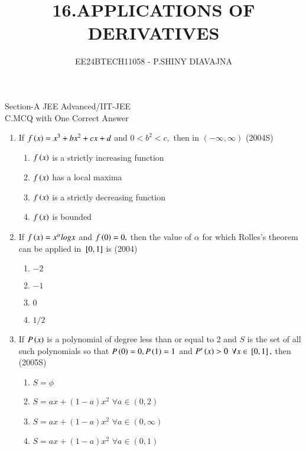 \documentclass[journal,12pt,twocolumn]{IEEEtran}
\theoremstyle{remark}
\begin{document}

\vspace{3cm}

\title{16.APPLICATIONS OF DERIVATIVES}
\author{EE24BTECH11058 - P.SHINY DIAVAJNA}

\maketitle
\newpage
\bigskip


\renewcommand{\thefigure}{\theenumi}
\renewcommand{\thetable}{\theenumi}

  Section-A JEE Advanced/IIT-JEE\\
  
  C.MCQ with One Correct Answer\\ 
    \begin{enumerate} 
      \item
	  If $f\left(x\right)=x^3+bx^2+cx+d$ and $0<b^2<c,$ then in $(-\infty,\infty)$ \hfill(2004S)
        \begin{enumerate}
	 \item $f\left(x\right)$ is a strictly increasing function
	 \item $f\left(x\right)$ has a local maxima
	 \item $f\left(x\right)$ is a strictly decreasing function
	 \item $f\left(x\right)$ is bounded  \\
        \end{enumerate}
    
 
       \item
	       If $f\left(x\right)=x^{\alpha} logx$ and $f\left(0\right)=0,$ then the value of $\alpha$ for which Rolles's theorem can be applied in ${}\left[0,1\right]$ is 
		    \hfill(2004) 
        \begin {enumerate}
         \item $-2$
         \item $-1$
         \item $0$
         \item $1/2$\\
        \end{enumerate}
   
    
     \item
	     If $P\left(x\right)$ is a polynomial of degree less than or equal to 2 and $S$ is the set of all such polynomials so that $P\left(0\right)=0,P\left(1\right)=1$ and $P'\left(x\right)>0$ $\forall x \in {}\left[0,1\right],$ then
     \hfill(2005S)
    \begin{enumerate}
        \item  $S=\phi$
        \item  $S=ax+(1-a)x^2$ $\forall a \in (0,2)$
        \item  $S=ax+(1-a)x^2$ $\forall a\in (0,\infty)$
        \item  $S=ax+(1-a)x^2$ $\forall a \in (0,1)$ \\
    \end{enumerate} 
    

\end{enumerate}
\end{document}
